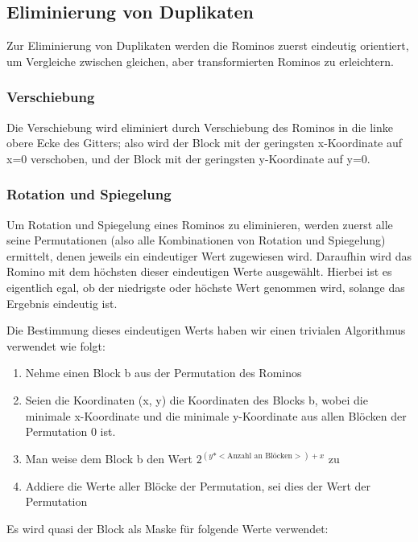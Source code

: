 \documentclass[a4paper,10pt,ngerman]{scrartcl}
\begin{document}
\subsection{Eliminierung von Duplikaten} \label{dupl}

Zur Eliminierung von Duplikaten werden die Rominos zuerst eindeutig orientiert, um Vergleiche zwischen gleichen, aber transformierten Rominos zu erleichtern.

\subsubsection{Verschiebung}

Die Verschiebung wird eliminiert durch Verschiebung des Rominos in die linke obere Ecke des Gitters; also wird der Block mit der geringsten x-Koordinate auf x=0 verschoben, und der Block mit der geringsten y-Koordinate auf y=0.

\subsubsection{Rotation und Spiegelung} \label{uniqueCode}

Um Rotation und Spiegelung eines Rominos zu eliminieren,
werden zuerst alle seine Permutationen
(also alle Kombinationen von Rotation und Spiegelung)
ermittelt, denen jeweils ein eindeutiger Wert zugewiesen wird.
Daraufhin wird das Romino mit dem höchsten dieser eindeutigen Werte ausgewählt.
Hierbei ist es eigentlich egal, ob der niedrigste oder höchste Wert genommen
wird, solange das Ergebnis eindeutig ist.

Die Bestimmung dieses eindeutigen Werts haben wir einen trivialen Algorithmus
verwendet wie folgt:

\begin{enumerate}
\item Nehme einen Block b aus der Permutation des Rominos
\item Seien die Koordinaten (x, y) die Koordinaten des Blocks b, wobei die minimale x-Koordinate und die minimale y-Koordinate aus allen Blöcken der Permutation 0 ist.
\item Man weise dem Block b den Wert \(2^{(y * <\text{Anzahl an Blöcken}>) + x}\) zu
\item Addiere die Werte aller Blöcke der Permutation, sei dies der Wert der Permutation
\end{enumerate}


Es wird quasi der Block als Maske für folgende Werte verwendet:
\end{document}
